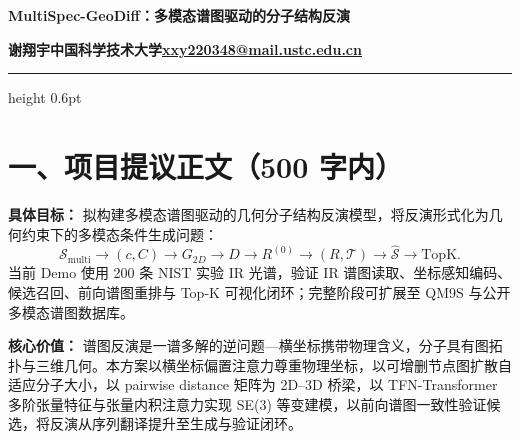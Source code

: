 \documentclass[10pt,a4paper]{ctexart}
\newcommand{\spec}{\mathcal S}
\begin{document}
\thispagestyle{empty}

{\LARGE\bfseries MultiSpec-GeoDiff：多模态谱图驱动的分子结构反演\par}
\vspace{3pt}
{\small\bfseries 谢翔宇\quad 中国科学技术大学\quad \href{mailto:xxy220348@mail.ustc.edu.cn}{xxy220348@mail.ustc.edu.cn}\par}
\vspace{4pt}
\hrule height 0.6pt
\vspace{4pt}

\vspace{2pt}
\noindent{}
\vspace{6pt}

\section*{一、项目提议正文（500 字内）}

\textbf{具体目标：}
拟构建多模态谱图驱动的几何分子结构反演模型，将反演形式化为几何约束下的多模态条件生成问题：
\[
\spec_{\mathrm{multi}} \rightarrow (c,C) \rightarrow G_{2D} \rightarrow D \rightarrow R^{(0)} \rightarrow (R,\mathcal T) \rightarrow \hat{\spec} \rightarrow \mathrm{TopK}.
\]
当前 Demo 使用 200 条 NIST 实验 IR 光谱，验证 IR 谱图读取、坐标感知编码、候选召回、前向谱图重排与 Top-K 可视化闭环；完整阶段可扩展至 QM9S 与公开多模态谱图数据库。

\textbf{核心价值：}
谱图反演是一谱多解的逆问题---横坐标携带物理含义，分子具有图拓扑与三维几何。本方案以横坐标偏置注意力尊重物理坐标，以可增删节点图扩散自适应分子大小，以 pairwise distance 矩阵为 2D--3D 桥梁，以 TFN-Transformer 多阶张量特征与张量内积注意力实现 SE(3) 等变建模，以前向谱图一致性验证候选，将反演从序列翻译提升至生成与验证闭环。
\end{document}
